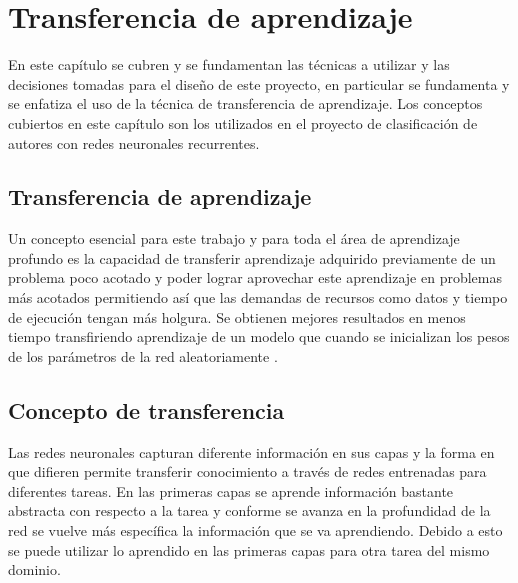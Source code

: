 
\chapter{Transferencia de aprendizaje} %

\label{Chapter3} %

En este capítulo se cubren y se fundamentan las técnicas a utilizar y las decisiones tomadas para el diseño de este proyecto, en particular se fundamenta y se enfatiza el uso de la técnica de transferencia de aprendizaje. Los conceptos cubiertos en este capítulo son los utilizados en el proyecto de clasificación de autores con redes neuronales recurrentes.

\section{Transferencia de aprendizaje} %

Un concepto esencial para este trabajo y para toda el área de aprendizaje profundo es la capacidad de transferir aprendizaje adquirido previamente de un problema poco acotado y poder lograr aprovechar este aprendizaje en problemas más acotados permitiendo así que las demandas de recursos como datos y tiempo de ejecución tengan más holgura. Se obtienen mejores resultados en menos tiempo transfiriendo aprendizaje de un modelo que cuando se inicializan los pesos de los parámetros de la red aleatoriamente \parencite{Erhan:2010:WUP}.

\section{Concepto de transferencia}

Las redes neuronales capturan diferente información en sus capas \parencite{yosinski:2014, zeiler2014visualizing} y la forma en que difieren permite transferir conocimiento a través de redes entrenadas para diferentes tareas. En las primeras capas se aprende información bastante abstracta con respecto a la tarea y conforme se avanza en la profundidad de la red se vuelve más específica la información que se va aprendiendo. Debido a esto se puede utilizar lo aprendido en las primeras capas para otra tarea del mismo dominio.

